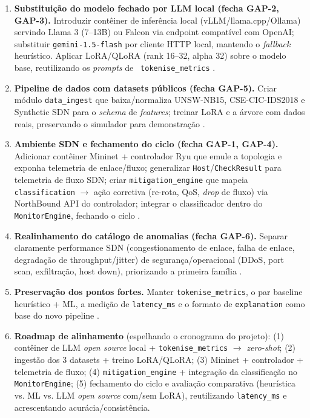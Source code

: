 \documentclass[12pt,a4paper]{article}
\begin{document}
\begin{enumerate}
  \item \textbf{Substituição do modelo fechado por LLM local (fecha GAP-2,
  GAP-3).} Introduzir contêiner de inferência local (vLLM/llama.cpp/Ollama)
  servindo Llama 3 (7--13B) ou Falcon via endpoint compatível com OpenAI;
  substituir \texttt{gemini-1.5-flash} por cliente HTTP local, mantendo o
  \textit{fallback} heurístico. Aplicar LoRA/QLoRA (rank 16--32, alpha 32)
  sobre o modelo base, reutilizando os \textit{prompts} de \texttt{
  tokenise\_metrics} \cite{rA41}\cite{rA42}\cite{rA312}.
  \item \textbf{Pipeline de dados com datasets públicos (fecha GAP-5).} Criar
  módulo \texttt{data\_ingest} que baixa/normaliza UNSW-NB15, CSE-CIC-IDS2018
  e Synthetic SDN para o \textit{schema} de \textit{features}; treinar LoRA e a
  árvore com dados reais, preservando o simulador para demonstração \cite{rA61}\cite{rA64}.
  \item \textbf{Ambiente SDN e fechamento do ciclo (fecha GAP-1, GAP-4).}
  Adicionar contêiner Mininet + controlador Ryu que emule a topologia e exponha
  telemetria de enlace/fluxo; generalizar \texttt{Host}/\texttt{CheckResult}
  para telemetria de fluxo SDN; criar \texttt{mitigation\_engine} que mapeia
  \texttt{classification} $\rightarrow$ ação corretiva (re-rota, QoS,
  \textit{drop} de fluxo) via NorthBound API do controlador; integrar o
  classificador dentro do \texttt{MonitorEngine}, fechando o ciclo \cite{rA14}\cite{rA116}\cite{rA133}.
  \item \textbf{Realinhamento do catálogo de anomalias (fecha GAP-6).}
  Separar claramente performance SDN (congestionamento de enlace, falha de
  enlace, degradação de throughput/jitter) de segurança/operacional (DDoS, port
  scan, exfiltração, host down), priorizando a primeira família \cite{rA512}.
  \item \textbf{Preservação dos pontos fortes.} Manter \texttt{tokenise\_metrics},
  o par baseline heurístico + ML, a medição de \texttt{latency\_ms} e o formato
  de \texttt{explanation} como base do novo pipeline \cite{rA616}\cite{rA431}.
  \item \textbf{Roadmap de alinhamento} (espelhando o cronograma do projeto):
  (1) contêiner de LLM \textit{open source} local + \texttt{tokenise\_metrics}
  $\rightarrow$ \textit{zero-shot}; (2) ingestão dos 3 datasets + treino
  LoRA/QLoRA; (3) Mininet + controlador + telemetria de fluxo; (4)
  \texttt{mitigation\_engine} + integração da classificação no
  \texttt{MonitorEngine}; (5) fechamento do ciclo e avaliação comparativa
  (heurística vs. ML vs. LLM \textit{open source} com/sem LoRA), reutilizando
  \texttt{latency\_ms} e acrescentando acurácia/consistência.
\end{enumerate}
\end{document}

